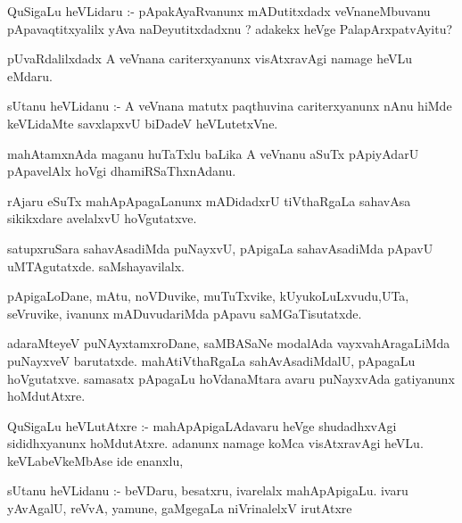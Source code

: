 \documentclass{article}
\begin{document}
\begin{mn}
QuSigaLu  heVLidaru :- pApakAyaRvanunx mADutitxdadx veVnaneMbuvanu pApavaqtitxyalilx 
yAva naDeyutitxdadxnu ? adakekx heVge PalapArxpatvAyitu?
\end{mn}

\begin{mn}
pUvaRdalilxdadx A veVnana cariterxyanunx visAtxravAgi namage heVLu eMdaru. 
\end{mn}

\begin{mn}
sUtanu heVLidanu :- A veVnana matutx paqthuvina cariterxyanunx nAnu hiMde keVLidaMte savxlapxvU biDadeV heVLutetxVne.
\end{mn}

\begin{mn}
mahAtamxnAda maganu huTaTxlu baLika A veVnanu aSuTx pApiyAdarU pApavelAlx hoVgi dhamiRSaThxnAdanu. 
\end{mn}

\begin{mn}
rAjaru eSuTx mahApApagaLanunx mADidadxrU tiVthaRgaLa sahavAsa sikikxdare avelalxvU hoVgutatxve. 
\end{mn}

\begin{mn}
satupxruSara sahavAsadiMda puNayxvU, pApigaLa sahavAsadiMda pApavU uMTAgutatxde.  saMshayavilalx.
\end{mn}

\begin{mn}
pApigaLoDane, mAtu, noVDuvike, muTuTxvike, kUyukoLuLxvudu,UTa, seVruvike, 
ivanunx mADuvudariMda pApavu saMGaTisutatxde.
\end{mn}

\begin{mn}
adaraMteyeV puNAyxtamxroDane, saMBASaNe modalAda vayxvahAragaLiMda puNayxveV 
barutatxde. mahAtiVthaRgaLa sahAvAsadiMdalU, pApagaLu hoVgutatxve.  samasatx 
pApagaLu hoVdanaMtara avaru puNayxvAda gatiyanunx hoMdutAtxre.
\end{mn}

\begin{mn}
QuSigaLu heVLutAtxre :- mahApApigaLAdavaru heVge shudadhxvAgi sididhxyanunx 
hoMdutAtxre.  adanunx namage koMca visAtxravAgi heVLu. keVLabeVkeMbAse ide enanxlu,
\end{mn}

\begin{mn}
sUtanu heVLidanu :- beVDaru, besatxru, ivarelalx mahApApigaLu.  ivaru yAvAgalU, 
reVvA, yamune, gaMgegaLa niVrinalelxV irutAtxre
\end{mn}
\end{document}
